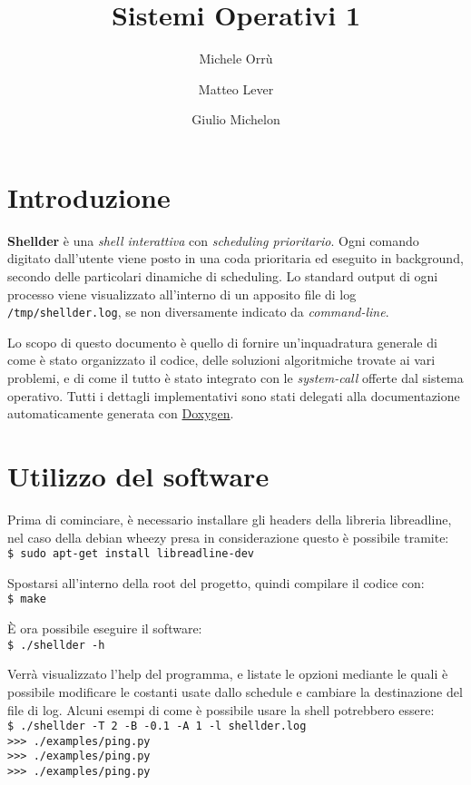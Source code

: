 \documentclass[11pt]{article}
\title{\textbf{Sistemi Operativi 1}}
\author{Michele Orr\`u \and Matteo Lever \and Giulio Michelon}
\date{}
\begin{document}
\newcommand{\code}{\texttt}

\maketitle

\section{Introduzione}

\textbf{Shellder} \`e una \emph{shell interattiva} con \emph{scheduling prioritario}.
Ogni comando digitato dall'utente viene posto in una coda prioritaria ed
eseguito in background, secondo delle particolari dinamiche di scheduling. Lo
standard output di ogni processo viene visualizzato all'interno di un apposito
file di log \code{/tmp/shellder.log}, se non diversamente indicato da
\emph{command-line}.

Lo scopo di questo documento \`e quello di fornire un'inquadratura generale di
come \`e stato organizzato il codice, delle soluzioni algoritmiche trovate ai
vari problemi, e di come il tutto \`e stato integrato con le \emph{system-call}
offerte dal sistema operativo. Tutti i dettagli implementativi sono stati
delegati alla documentazione automaticamente generata con
\href{http://www.stack.nl/~dimitri/doxygen/}{Doxygen}.

\section{Utilizzo del software}
\label{usage}

Prima di cominciare, \`e necessario installare gli headers della libreria libreadline,
nel caso della debian wheezy presa in considerazione questo \`e possibile tramite:
\\ \code{\$ sudo apt-get install libreadline-dev}

\noindent Spostarsi all'interno della root del progetto, quindi compilare il codice con:
\\ \code{\$ make}

\noindent \`E ora possibile eseguire il software:
\\ \code{\$ ./shellder -h}

\noindent Verr\`a visualizzato l'help del programma, e listate le opzioni mediante le quali \`e
possibile modificare le costanti usate dallo schedule e cambiare la destinazione del file di log.
Alcuni esempi di come \`e possibile usare la shell potrebbero essere:
\\ \code{\$ ./shellder  -T 2  -B -0.1  -A 1  -l shellder.log}
\\ \code{>>> ./examples/ping.py }
\\ \code{>>> ./examples/ping.py }
\\ \code{>>> ./examples/ping.py }
\end{document}
